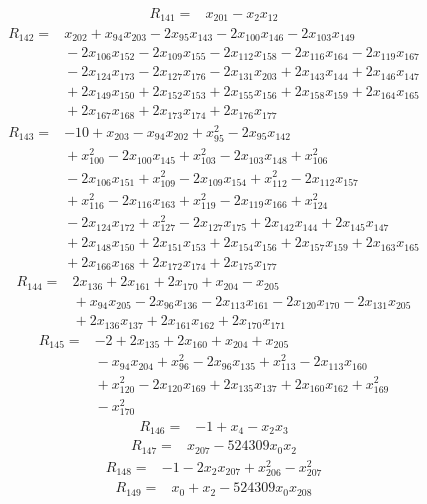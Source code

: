 \begin{align*}
R_{141} ={}& x_{201} - x_{2} x_{12}
\end{align*}
\begin{align*}
R_{142} ={}& x_{202} + x_{94} x_{203} - 2x_{95} x_{143} - 2x_{100} x_{146} - 2x_{103} x_{149} \\
&{} -2x_{106} x_{152} - 2x_{109} x_{155} - 2x_{112} x_{158} - 2x_{116} x_{164} - 2x_{119} x_{167} \\
&{} -2x_{124} x_{173} - 2x_{127} x_{176} - 2x_{131} x_{203} + 2x_{143} x_{144} + 2x_{146} x_{147} \\
&{} + 2x_{149} x_{150} + 2x_{152} x_{153} + 2x_{155} x_{156} + 2x_{158} x_{159} + 2x_{164} x_{165} \\
&{} + 2x_{167} x_{168} + 2x_{173} x_{174} + 2x_{176} x_{177}
\end{align*}
\begin{align*}
R_{143} ={}& -10 + x_{203} - x_{94} x_{202} + x_{95}^{2} - 2x_{95} x_{142} \\
&{} + x_{100}^{2} - 2x_{100} x_{145} + x_{103}^{2} - 2x_{103} x_{148} + x_{106}^{2} \\
&{} -2x_{106} x_{151} + x_{109}^{2} - 2x_{109} x_{154} + x_{112}^{2} - 2x_{112} x_{157} \\
&{} + x_{116}^{2} - 2x_{116} x_{163} + x_{119}^{2} - 2x_{119} x_{166} + x_{124}^{2} \\
&{} -2x_{124} x_{172} + x_{127}^{2} - 2x_{127} x_{175} + 2x_{142} x_{144} + 2x_{145} x_{147} \\
&{} + 2x_{148} x_{150} + 2x_{151} x_{153} + 2x_{154} x_{156} + 2x_{157} x_{159} + 2x_{163} x_{165} \\
&{} + 2x_{166} x_{168} + 2x_{172} x_{174} + 2x_{175} x_{177}
\end{align*}
\begin{align*}
R_{144} ={}& 2x_{136} + 2x_{161} + 2x_{170} + x_{204} - x_{205} \\
&{} + x_{94} x_{205} - 2x_{96} x_{136} - 2x_{113} x_{161} - 2x_{120} x_{170} - 2x_{131} x_{205} \\
&{} + 2x_{136} x_{137} + 2x_{161} x_{162} + 2x_{170} x_{171}
\end{align*}
\begin{align*}
R_{145} ={}& -2 + 2x_{135} + 2x_{160} + x_{204} + x_{205} \\
&{} -x_{94} x_{204} + x_{96}^{2} - 2x_{96} x_{135} + x_{113}^{2} - 2x_{113} x_{160} \\
&{} + x_{120}^{2} - 2x_{120} x_{169} + 2x_{135} x_{137} + 2x_{160} x_{162} + x_{169}^{2} \\
&{} -x_{170}^{2}
\end{align*}
\begin{align*}
R_{146} ={}& -1 + x_{4} - x_{2} x_{3}
\end{align*}
\begin{align*}
R_{147} ={}& x_{207} - 524309x_{0} x_{2}
\end{align*}
\begin{align*}
R_{148} ={}& -1 - 2x_{2} x_{207} + x_{206}^{2} - x_{207}^{2}
\end{align*}
\begin{align*}
R_{149} ={}& x_{0} + x_{2} - 524309x_{0} x_{208}
\end{align*}
\endgroup
